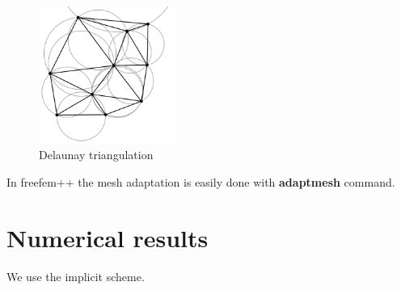 \documentclass[a4paper]{report}
\begin{document}
\begin{itemize}
\begin{figure}[H]
    \centering
    \includegraphics[width=0.4\textwidth]{Delaunay.png}
    \caption{ Delaunay triangulation}
\end{figure}

In freefem++ the mesh adaptation is easily done with \textbf{adaptmesh} command. 




\section{Numerical results}
We use the implicit scheme.

\end{itemize}
\end{document}
